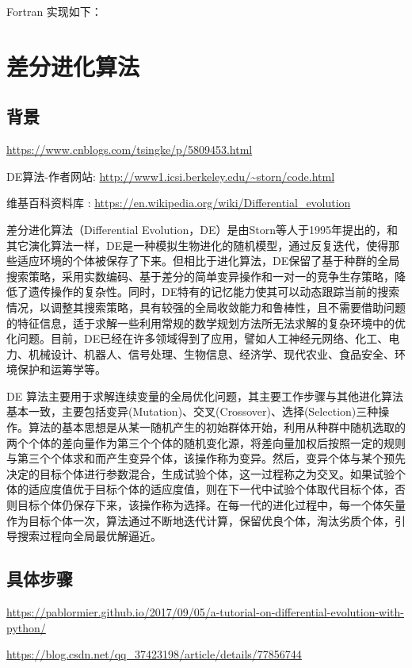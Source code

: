 Fortran 实现如下：



\chapter{差分进化算法}
\section{背景}
\url{https://www.cnblogs.com/tsingke/p/5809453.html}

DE算法-作者网站: \url{http://www1.icsi.berkeley.edu/~storn/code.html}

维基百科资料库  : \url{https://en.wikipedia.org/wiki/Differential_evolution}

差分进化算法（Differential Evolution，DE）是由Storn等人于1995年提出的，和其它演化算法一样，DE是一种模拟生物进化的随机模型，通过反复迭代，使得那些适应环境的个体被保存了下来。但相比于进化算法，DE保留了基于种群的全局搜索策略，采用实数编码、基于差分的简单变异操作和一对一的竞争生存策略，降低了遗传操作的复杂性。同时，DE特有的记忆能力使其可以动态跟踪当前的搜索情况，以调整其搜索策略，具有较强的全局收敛能力和鲁棒性，且不需要借助问题的特征信息，适于求解一些利用常规的数学规划方法所无法求解的复杂环境中的优化问题。目前，DE已经在许多领域得到了应用，譬如人工神经元网络、化工、电力、机械设计、机器人、信号处理、生物信息、经济学、现代农业、食品安全、环境保护和运筹学等。
 
 
DE 算法主要用于求解连续变量的全局优化问题，其主要工作步骤与其他进化算法基本一致，主要包括变异(Mutation)、交叉(Crossover)、选择(Selection)三种操作。算法的基本思想是从某一随机产生的初始群体开始，利用从种群中随机选取的两个个体的差向量作为第三个个体的随机变化源，将差向量加权后按照一定的规则与第三个个体求和而产生变异个体，该操作称为变异。然后，变异个体与某个预先决定的目标个体进行参数混合，生成试验个体，这一过程称之为交叉。如果试验个体的适应度值优于目标个体的适应度值，则在下一代中试验个体取代目标个体，否则目标个体仍保存下来，该操作称为选择。在每一代的进化过程中，每一个体矢量作为目标个体一次，算法通过不断地迭代计算，保留优良个体，淘汰劣质个体，引导搜索过程向全局最优解逼近。


\section{具体步骤}
{\small\url{https://pablormier.github.io/2017/09/05/a-tutorial-on-differential-evolution-with-python/}}

\url{https://blog.csdn.net/qq_37423198/article/details/77856744}

